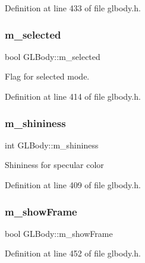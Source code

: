 Definition at line 433 of file glbody.\+h.

\mbox{\label{class_g_l_body_aa98197c0f7376b5afa58302eb96cb05e}} 
\subsubsection{\texorpdfstring{m\_selected}{m\_selected}}
{\footnotesize\ttfamily bool G\+L\+Body\+::m\+\_\+selected\hspace{0.3cm}{\ttfamily [protected]}}

Flag for selected mode. 

Definition at line 414 of file glbody.\+h.

\mbox{\label{class_g_l_body_a4e6949c8876ffe0bc4fddddfa4dd6c9b}} 
\subsubsection{\texorpdfstring{m\_shininess}{m\_shininess}}
{\footnotesize\ttfamily int G\+L\+Body\+::m\+\_\+shininess\hspace{0.3cm}{\ttfamily [protected]}}

Shininess for specular color 

Definition at line 409 of file glbody.\+h.

\mbox{\label{class_g_l_body_af6486869505b4269277a13734acc9bcd}} 
\subsubsection{\texorpdfstring{m\_showFrame}{m\_showFrame}}
{\footnotesize\ttfamily bool G\+L\+Body\+::m\+\_\+show\+Frame\hspace{0.3cm}{\ttfamily [protected]}}



Definition at line 452 of file glbody.\+h.

\mbox{\label{class_g_l_body_a4707235e9ca92fd90399fb785759d946}} 
